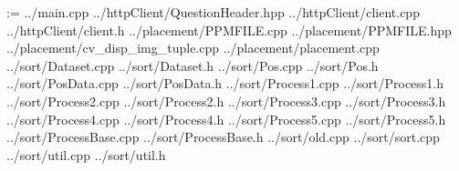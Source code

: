 \documentclass[a4j]{jarticle}
\begin{document}
\setlength{\columnsep}{40pt}
\begin{landscape}
 \begin{multicols}{2}


  \makeatletter
  \@tfor\xx@t:=
  {../main.cpp}
  {../httpClient/QuestionHeader.hpp}
  {../httpClient/client.cpp}
  {../httpClient/client.h}
  {../placement/PPMFILE.cpp}
  {../placement/PPMFILE.hpp}
  {../placement/cv_disp_img_tuple.cpp}
  {../placement/placement.cpp}
  {../sort/Dataset.cpp}
  {../sort/Dataset.h}
  {../sort/Pos.cpp}
  {../sort/Pos.h}
  {../sort/PosData.cpp}
  {../sort/PosData.h}
  {../sort/Process1.cpp}
  {../sort/Process1.h}
  {../sort/Process2.cpp}
  {../sort/Process2.h}
  {../sort/Process3.cpp}
  {../sort/Process3.h}
  {../sort/Process4.cpp}
  {../sort/Process4.h}
  {../sort/Process5.cpp}
  {../sort/Process5.h}
  {../sort/ProcessBase.cpp}
  {../sort/ProcessBase.h}
  {../sort/old.cpp}
  {../sort/sort.cpp}
  {../sort/util.cpp}
  {../sort/util.h}
  \do{%
   
   {\xx@t}
  }
  \makeatother
 \end{multicols}
\end{landscape}
\end{document}

